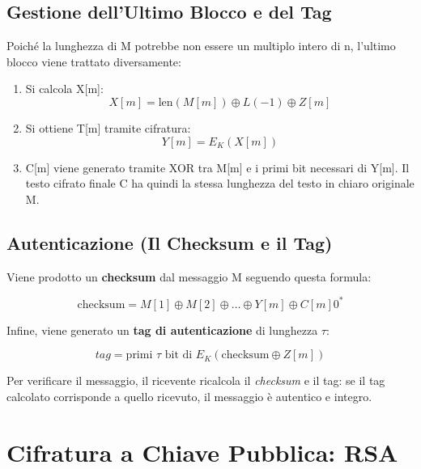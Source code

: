 \documentclass{article}
\begin{document}
\subsection*{Gestione dell'Ultimo Blocco e del Tag}
Poiché la lunghezza di M potrebbe non essere un multiplo intero di n, l'ultimo blocco viene trattato diversamente:

\begin{enumerate}
    \item Si calcola X[m]:
    \begin{equation*}
        X[m] = \text{len}(M[m]) \oplus L(-1) \oplus Z[m]
    \end{equation*}
    \item Si ottiene T[m] tramite cifratura:
    \begin{equation*}
        Y[m] = E_K(X[m])
    \end{equation*}
    \item C[m] viene generato tramite XOR tra M[m] e i primi bit necessari di Y[m]. Il testo cifrato finale C ha quindi la stessa lunghezza del testo in chiaro originale M.
\end{enumerate}

\subsection*{Autenticazione (Il Checksum e il Tag)}
Viene prodotto un \textbf{checksum} dal messaggio M seguendo questa formula:

\begin{equation*}
    \text{checksum} = M[1] \oplus M[2] \oplus \dots \oplus Y[m] \oplus C[m]0^*
\end{equation*}

Infine, viene generato un \textbf{tag di autenticazione} di lunghezza $\tau$:

\begin{equation*}
    tag = \text{primi } \tau \text{ bit di } E_K(\text{checksum} \oplus Z[m])
\end{equation*}

Per verificare il messaggio, il ricevente ricalcola il \textit{checksum} e il tag: se il tag calcolato corrisponde a quello ricevuto, il messaggio è autentico e integro.

\vspace{0.8cm}

\section*{Cifratura a Chiave Pubblica: RSA}
\end{document}
